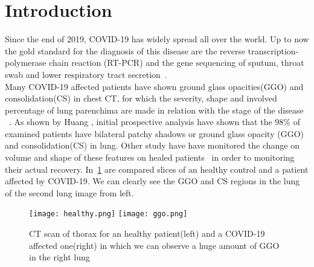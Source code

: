 \documentclass{standalone}
\begin{document}
\chapter*{Introduction}


Since the end of 2019, COVID-19 has widely spread all over the world. Up to now the gold standard for the diagnosis of this disease are the reverse transcription-polymerase chain reaction (RT-PCR) and the gene sequencing of sputum, throat swab and lower respiratory tract secretion~\cite{ART:Zhao}.\\ Many COVID-19 affected patients have shown ground glass opacities(GGO) and consolidation(CS) in chest CT, for which the severity, shape and involved percentage of lung parenchima are made in relation with the stage of the disease ~\cite{ART:Bernheim}.  As shown by Huang \cite{ART:Huang}, initial prospective analysis have shown that the $98\%$ of examined patients have bilateral patchy shadows or ground glass opacity (GGO) and consolidation(CS) in lung. Other study have have monitored the change on volume and shape of these features on healed patients~\cite{ART:Ai} in order to monitoring their actual recovery. In \figurename\,\ref{fig:HealthVSCovid} are compared slices of an healthy control and a patient affected by COVID-19. We can clearly see the GGO and CS regions in the lung of the second lung image from left.\\
	
\begin{figure}[h!]
	\centering
	\texttt{[image: healthy.png]}
	\quad
	\texttt{[image: ggo.png]}
	\caption{CT scan of thorax for an healthy patient(left) and a COVID-19 affected one(right) in which we can observe a huge amount of GGO in the right lung}\label{fig:HealthVSCovid}
\end{figure} 
\end{document}
